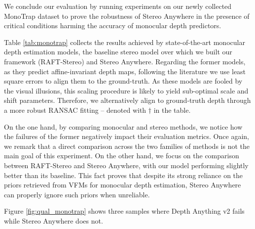 \documentclass[10pt,twocolumn,letterpaper]{article}
\newcommand{\method}[0]{Stereo Anywhere\xspace}
\newcommand{\dataset}[0]{MonoTrap\xspace}
\begin{document}
We conclude our evaluation by running experiments on our newly collected \dataset dataset to prove the robustness of \method in the presence of critical conditions harming the accuracy of monocular depth predictors.

Table \ref{tab:monotrap} collects the results achieved by state-of-the-art monocular depth estimation models, the baseline stereo model over which we built our framework (RAFT-Stereo) and \method. Regarding the former models, as they predict affine-invariant depth maps, following the literature \cite{Ranftl2022} we use least square errors to align them to the ground-truth. As these models are fooled by the visual illusions, this scaling procedure is likely to yield sub-optimal scale and shift parameters. Therefore, we alternatively align to ground-truth depth through a more robust RANSAC fitting -- denoted with $\dagger$ in the table.

On the one hand, by comparing monocular and stereo methods, we notice how the failures of the former negatively impact their evaluation metrics. Once again, we remark that a direct comparison across the two families of methods is not the main goal of this experiment.
On the other hand, we focus on the comparison between RAFT-Stereo and \method, with our model performing slightly better than its baseline. This fact proves that despite its strong reliance on the priors retrieved from VFMs for monocular depth estimation, \method can properly ignore such priors when unreliable.

Figure \ref{fig:qual_monotrap} shows three samples where Depth Anything v2 fails while \method does not.
\end{document}
